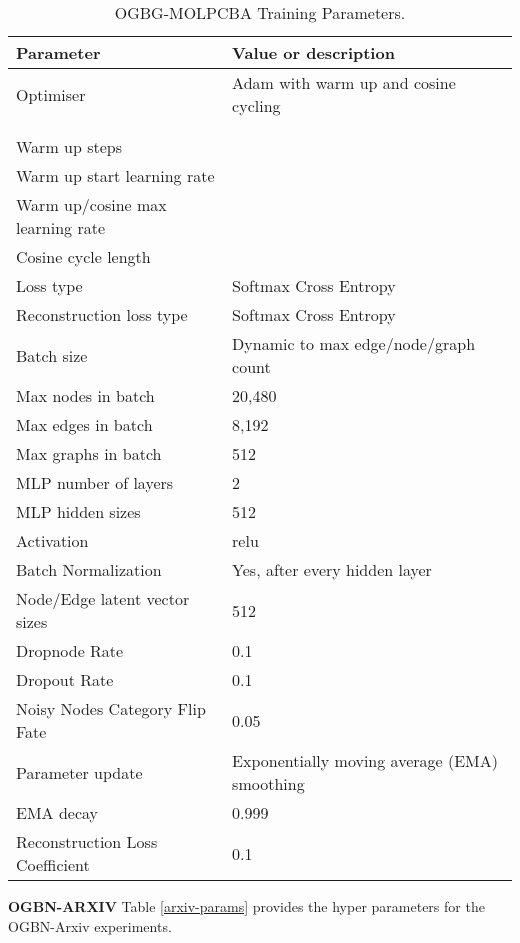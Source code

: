 \documentclass{article} \usepackage{iclr2022_conference,times}
\begin{document}
\begin{table}[]
\caption{OGBG-MOLPCBA Training Parameters.}
    \label{molpcba-params}
    \centering
    \begin{tabular}{ll}
      \toprule
       Parameter & Value or description \\
       \midrule
       Optimiser & Adam with warm up and cosine cycling \\
          &  \\              
          &  \\                     
       Warm up steps    &  \\
       Warm up start learning rate    &  \\       
       Warm up/cosine max learning rate    &  \\       
       Cosine cycle length    &  \\       
       Loss type & Softmax Cross Entropy \\
       Reconstruction loss type & Softmax Cross Entropy \\
     \midrule
       Batch size & Dynamic to max edge/node/graph count \\
       Max nodes in batch & 20,480 \\
       Max edges in batch & 8,192 \\   
       Max graphs in batch & 512 \\    
     \midrule
       MLP number of layers & 2 \\
       MLP hidden sizes & 512 \\
       Activation & relu \\
       Batch Normalization & Yes, after every hidden layer \\
       Node/Edge latent vector sizes & 512 \\ 
     \midrule
       Dropnode Rate & 0.1 \\
       Dropout Rate & 0.1 \\
       Noisy Nodes Category Flip Fate & 0.05 \\
       Parameter update & Exponentially moving average (EMA) smoothing \\
       EMA decay & 0.999 \\
       Reconstruction Loss Coefficient & 0.1 \\
    \bottomrule

\end{tabular}
\end{table}

\textbf{OGBN-ARXIV} Table \ref{arxiv-params} provides the hyper parameters for the OGBN-Arxiv experiments.
\end{document}
